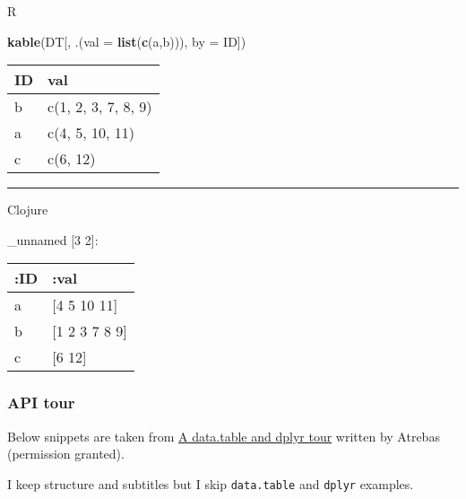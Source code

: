 \documentclass[]{article}
\newenvironment{Shaded}{\begin{snugshade}}{\end{snugshade}}
\newcommand{\KeywordTok}[1]{\textcolor[rgb]{0.13,0.29,0.53}{\textbf{#1}}}
\newcommand{\DataTypeTok}[1]{\textcolor[rgb]{0.13,0.29,0.53}{#1}}
\newcommand{\AttributeTok}[1]{\textcolor[rgb]{0.77,0.63,0.00}{#1}}
\newcommand{\NormalTok}[1]{#1}
\begin{document}
R

\begin{Shaded}
\begin{Highlighting}[]
\KeywordTok{kable}\NormalTok{(DT[, .(}\DataTypeTok{val =} \KeywordTok{list}\NormalTok{(}\KeywordTok{c}\NormalTok{(a,b))), }\DataTypeTok{by =}\NormalTok{ ID])}
\end{Highlighting}
\end{Shaded}

\begin{longtable}[]{@{}ll@{}}
\toprule
ID & val\tabularnewline
\midrule
\endhead
b & c(1, 2, 3, 7, 8, 9)\tabularnewline
a & c(4, 5, 10, 11)\tabularnewline
c & c(6, 12)\tabularnewline
\bottomrule
\end{longtable}

\begin{center}\rule{0.5\linewidth}{0.5pt}\end{center}

Clojure

\begin{Shaded}
\end{Shaded}

\_unnamed {[}3 2{]}:

\begin{longtable}[]{@{}ll@{}}
\toprule
:ID & :val\tabularnewline
\midrule
\endhead
a & {[}4 5 10 11{]}\tabularnewline
b & {[}1 2 3 7 8 9{]}\tabularnewline
c & {[}6 12{]}\tabularnewline
\bottomrule
\end{longtable}

\subsubsection{API tour}\label{api-tour}

Below snippets are taken from
\href{https://atrebas.github.io/post/2019-03-03-datatable-dplyr/}{A
data.table and dplyr tour} written by Atrebas (permission granted).

I keep structure and subtitles but I skip \texttt{data.table} and
\texttt{dplyr} examples.
\end{document}
